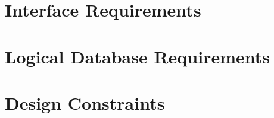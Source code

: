 \documentclass{scrreprt}
\begin{document}
\section{Interface Requirements}
\section{Logical Database Requirements}


\section{Design Constraints}
\end{document}
